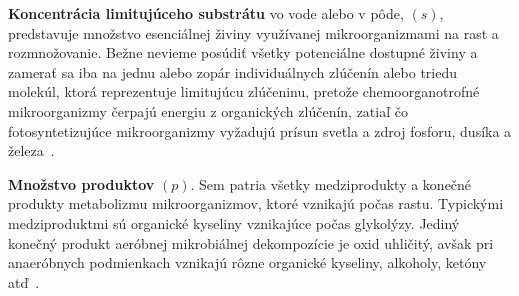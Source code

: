\textbf{Koncentrácia limitujúceho substrátu} vo vode alebo v pôde, $(s)$, predstavuje množstvo esenciálnej živiny využívanej mikroorganizmami na rast a rozmnožovanie. Bežne nevieme posúdiť všetky potenciálne dostupné živiny a zamerať sa iba na jednu alebo zopár individuálnych zlúčenín alebo triedu molekúl, ktorá reprezentuje limitujúcu zlúčeninu, pretože chemoorganotrofné mikroorganizmy čerpajú energiu z organických zlúčenín, zatiaľ čo fotosyntetizujúce mikroorganizmy vyžadujú prísun svetla a zdroj fosforu, dusíka a železa~\cite{panikov:kinetics_MO_processes:2016}.

\textbf{Množstvo produktov} $(p)$. Sem patria všetky medziprodukty a konečné produkty metabolizmu mikroorganizmov, ktoré vznikajú počas rastu. Typickými medziproduktmi sú organické kyseliny vznikajúce počas glykolýzy. Jediný konečný produkt aeróbnej mikrobiálnej dekompozície je oxid uhličitý, avšak pri anaeróbnych podmienkach vznikajú rôzne organické kyseliny, alkoholy, ketóny atď~\cite{panikov:kinetics_MO_processes:2016}.

